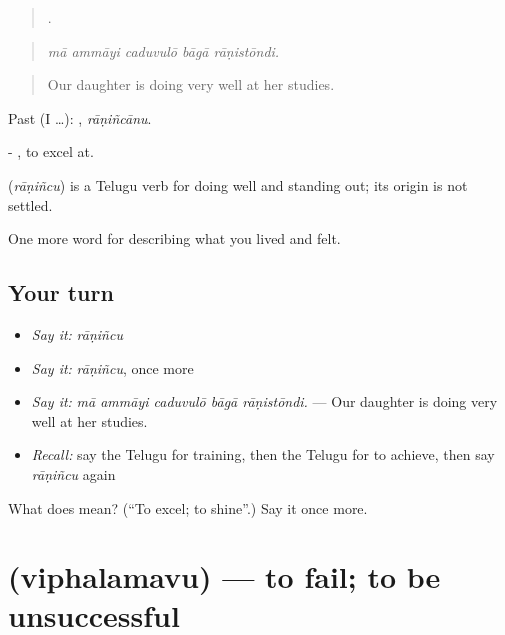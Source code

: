 \begin{quote}
    .
\end{quote}

\begin{quote}
\emph{mā ammāyi caduvulō bāgā rāṇistōndi.}
\end{quote}

\begin{quote}
Our daughter is doing very well at her studies.
\end{quote}

Past (I …): , \emph{rāṇiñcānu}.

- , to excel at.

\begin{cousinweb}
\textbf{} (\emph{rāṇiñcu}) is a Telugu verb for doing well and standing out; its origin is not settled.
\end{cousinweb}

\begin{grammarlens}[title={What you've built}]
One more word for describing what you lived and felt.
\end{grammarlens}

\subsection*{Your turn}
\begin{itemize}
\raggedright
  \item \emph{Say it:} \emph{rāṇiñcu}
  \item \emph{Say it:} \emph{rāṇiñcu}, once more
  \item \emph{Say it:} \emph{mā ammāyi caduvulō bāgā rāṇistōndi.} — Our daughter is doing very well at her studies.
  \item \emph{Recall:} say the Telugu for training, then the Telugu for to achieve, then say \emph{rāṇiñcu} again
\end{itemize}

\begin{tcolorbox}[breakable,colback=teal!4,colframe=teal!35!black,title={Before you move on}]
What does  mean? (\textquotedblleft{}To excel; to shine\textquotedblright{}.) Say it once more.
\end{tcolorbox}
\section[\texorpdfstring{\te{విఫలమవు} (viphalamavu)}{విఫలమవు (viphalamavu)}]{ (viphalamavu) — to fail; to be unsuccessful}

